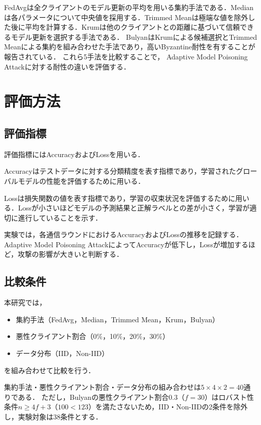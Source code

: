 \documentclass[a4j, twocolumn, dvipdfmx]{jsarticle}  %
\begin{document}
FedAvgは全クライアントのモデル更新の平均を用いる集約手法である．Medianは各パラメータについて中央値を採用する．Trimmed Meanは極端な値を除外した後に平均を計算する．Krumは他のクライアントとの距離に基づいて信頼できるモデル更新を選択する手法である．
BulyanはKrumによる候補選択とTrimmed Meanによる集約を組み合わせた手法であり，高いByzantine耐性を有することが報告されている．
これら5手法を比較することで，
Adaptive Model Poisoning Attackに対する耐性の違いを評価する．

\section{評価方法}

\subsection{評価指標}

評価指標にはAccuracyおよびLossを用いる．

Accuracyはテストデータに対する分類精度を表す指標であり，学習されたグローバルモデルの性能を評価するために用いる．

Lossは損失関数の値を表す指標であり，学習の収束状況を評価するために用いる．Lossが小さいほどモデルの予測結果と正解ラベルとの差が小さく，学習が適切に進行していることを示す．

実験では，各通信ラウンドにおけるAccuracyおよびLossの推移を記録する．Adaptive Model Poisoning AttackによってAccuracyが低下し，Lossが増加するほど，攻撃の影響が大きいと判断する．



\subsection{比較条件}

本研究では，

\begin{itemize}
\item 集約手法（FedAvg，Median，Trimmed Mean，Krum，Bulyan）
\item 悪性クライアント割合（0\%，10\%，20\%，30\%）
\item データ分布（IID，Non-IID）
\end{itemize}

を組み合わせて比較を行う．

集約手法・悪性クライアント割合・データ分布の組み合わせは$5 \times 4 \times 2 = 40$通りである．
ただし，Bulyanの悪性クライアント割合0.3（$f=30$）はロバスト性条件$n \geq 4f+3$（$100 < 123$）を満たさないため，IID・Non-IIDの2条件を除外し，実験対象は38条件とする．
\end{document}
